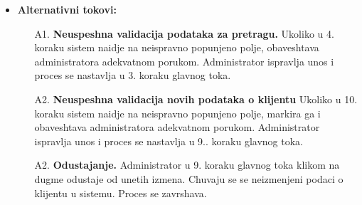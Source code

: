 \begin{itemize}
{}
\item{\textbf{Alternativni tokovi:} 
\begin{enumerate}
    \item [A1.] \textbf{Neuspeshna validacija podataka za pretragu.} Ukoliko u 4. koraku sistem naidje na neispravno popunjeno polje, obaveshtava administratora adekvatnom porukom. Administrator ispravlja unos i proces se nastavlja u 3. koraku glavnog toka.
    \item [A2.] \textbf{Neuspeshna validacija novih podataka o klijentu} Ukoliko u 10. koraku sistem naidje na neispravno popunjeno polje, markira ga i obaveshtava administratora adekvatnom porukom. Administrator ispravlja unos i proces se nastavlja u 9.. koraku glavnog toka.
    \item[A2.] \textbf{Odustajanje.} Administrator u 9. koraku glavnog toka klikom na dugme odustaje od unetih izmena. Chuvaju se se neizmenjeni podaci o klijentu u sistemu. Proces se zavrshava.
\end{enumerate}
}
\end{itemize}
